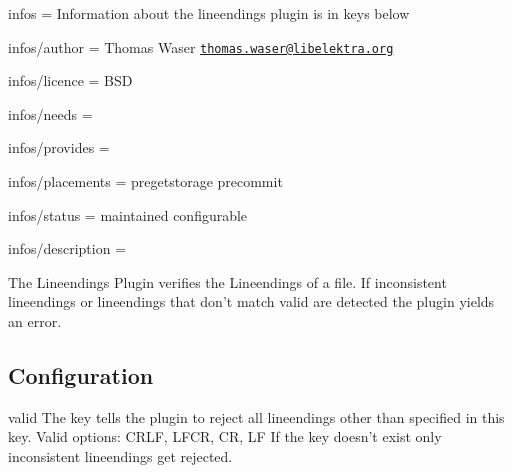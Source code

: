 
\begin{DoxyItemize}
\item infos = Information about the lineendings plugin is in keys below
\item infos/author = Thomas Waser \href{mailto:thomas.waser@libelektra.org}{\tt thomas.\+waser@libelektra.\+org}
\item infos/licence = B\+S\+D
\item infos/needs =
\item infos/provides =
\item infos/placements = pregetstorage precommit
\item infos/status = maintained configurable
\item infos/description =
\end{DoxyItemize}

The Lineendings Plugin verifies the Lineendings of a file. If inconsistent lineendings or lineendings that don't match {\ttfamily valid} are detected the plugin yields an error.

\subsection*{Configuration}

{\ttfamily valid} The key tells the plugin to reject all lineendings other than specified in this key. Valid options\+: C\+R\+L\+F, L\+F\+C\+R, C\+R, L\+F If the key doesn't exist only inconsistent lineendings get rejected. 